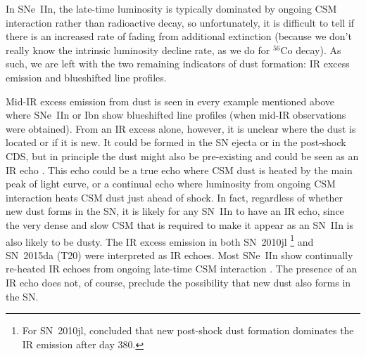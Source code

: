 \documentclass[fleqn,usenatbib,useAMS]{mnras}
\begin{document}
In SNe~IIn, the late-time luminosity is typically dominated by ongoing
CSM interaction rather than radioactive decay, so unfortunately, it is
difficult to tell if there is an increased rate of fading from
additional extinction (because we don't really know the intrinsic luminosity
decline rate, as we do for $^{56}$Co decay).  As such, we are left with
the two remaining indicators of dust formation: IR excess emission
and blueshifted line profiles.

Mid-IR excess emission from dust is seen in every example mentioned
above where SNe~IIn or Ibn show blueshifted line profiles (when 
mid-IR observations were obtained).  From an
IR excess alone, however, it is unclear where the dust is located or
if it is new.  It could be formed in the SN ejecta or in the
post-shock CDS, but in principle the dust might also be pre-existing and could be
seen as an IR echo \citep{gerardy02}.  This echo could be a true echo
where CSM dust is heated by the main peak of light curve, or
a continual echo where luminosity from ongoing CSM interaction
heats CSM dust just ahead of shock.  In fact, regardless of whether
new dust forms in the SN, it is likely for any SN~IIn to have an IR
echo, since the very dense and slow CSM that is required to make it
appear as an SN~IIn is also likely to be dusty.  The IR excess emission
in both SN~2010jl \citep{andrews11,sarangi18}\footnote{For SN~2010jl, \citet{sarangi18} concluded that new post-shock dust formation dominates the IR emission after day 380.}  and SN~2015da (T20) were
interpreted as IR echoes.  Most SNe~IIn show continually re-heated IR
echoes from ongoing late-time CSM interaction \citep{fox13}.  The
presence of an IR echo does not, of course, preclude the possibility
that new dust also forms in the SN.
\end{document}
